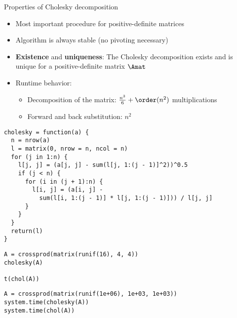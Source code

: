 \documentclass[11pt,compress,t,notes=noshow, xcolor=table]{beamer}
\begin{document}
\begin{vbframe}{Properties of Cholesky decomposition}

\begin{itemize}
\item Most important procedure for positive-definite matrices
\item Algorithm is always stable (no pivoting necessary)
\item \textbf{Existence} and \textbf{uniqueness}: The Cholesky decomposition exists and is unique for a positive-definite matrix $\Amat$
\item Runtime behavior:
\begin{itemize}
\item Decomposition of the matrix: $\frac{n^3}{6} + \order(n^2)$ multiplications
\item Forward and back substitution: $n^2$
\end{itemize}
\end{itemize}





\begin{verbatim}
cholesky = function(a) {
  n = nrow(a)
  l = matrix(0, nrow = n, ncol = n)
  for (j in 1:n) {
    l[j, j] = (a[j, j] - sum(l[j, 1:(j - 1)]^2))^0.5
    if (j < n) {
      for (i in (j + 1):n) {
        l[i, j] = (a[i, j] -
          sum(l[i, 1:(j - 1)] * l[j, 1:(j - 1)])) / l[j, j]
      }
    }
  }
  return(l)
}
\end{verbatim}


\begin{verbatim}
A = crossprod(matrix(runif(16), 4, 4))
cholesky(A)

t(chol(A))
\end{verbatim}


\begin{verbatim}
A = crossprod(matrix(runif(1e+06), 1e+03, 1e+03))
system.time(cholesky(A))
system.time(chol(A))
\end{verbatim}



\end{vbframe}
\end{document}
